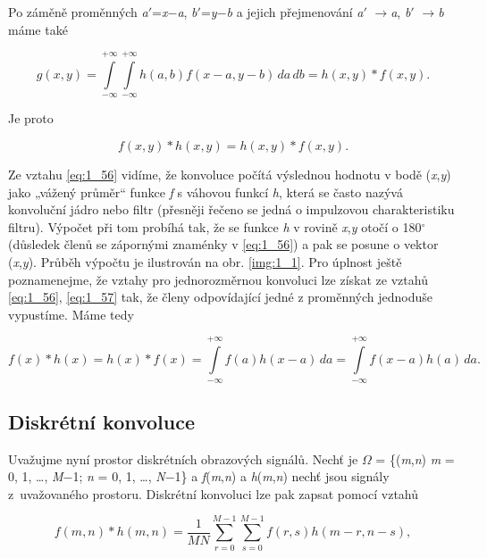 Po záměně proměnných \textit{a}$'$=\textit{x}$-$\textit{a}, \textit{b}$'$=\textit{y}$-$\textit{b} a jejich přejmenování \textit{a}$'$ $\rightarrow$\textit{a}, \textit{b}$'$ $\rightarrow$\textit{b} máme také

\begin{equation} \label{eq:1_57}
    g(x, y) = \int\limits_{-\infty}^{+\infty} \int\limits_{-\infty}^{+\infty} h(a, b) f(x-a, y-b) \,da \,db = h(x, y) \ast f(x, y).
\end{equation}

Je proto

\begin{equation} \label{eq:1_58}
    f(x, y) \ast h(x, y) = h(x, y) \ast f(x, y).
\end{equation}

Ze vztahu \eqref{eq:1_56} vidíme, že konvoluce počítá výslednou hodnotu v bodě (\textit{x},\textit{y}) jako „vážený průměr`` funkce \textit{f} s váhovou funkcí \textit{h}, která se často nazývá konvoluční jádro nebo filtr (přesněji řečeno se jedná o impulzovou charakteristiku filtru). Výpočet při tom probíhá tak, že se funkce \textit{h} v rovině \textit{x},\textit{y} otočí o 180$^\circ$ (důsledek členů se zápornými znaménky v \eqref{eq:1_56}) a pak se posune o vektor (\textit{x},\textit{y}). Průběh výpočtu je ilustrován na obr. \ref{img:1_1}. Pro úplnost ještě poznamenejme, že vztahy pro jednorozměrnou konvoluci lze získat ze vztahů \eqref{eq:1_56}, \eqref{eq:1_57} tak, že členy odpovídající jedné z proměnných jednoduše vypustíme. Máme tedy

\begin{equation} \label{eq:1_59}
    f(x) \ast h(x) = h(x) \ast f(x) = \int\limits_{-\infty}^{+\infty} f(a)h(x-a)\,da = \int\limits_{-\infty}^{+\infty} f(x-a) h(a)\,da.
\end{equation}

\subsection*{Diskrétní konvoluce} \label{sec:diskretni_konvoluce}

Uvažujme nyní prostor diskrétních obrazových signálů. Nechť je $\Omega$ = \{(\textit{m},\textit{n}) \textbar  \textit{m} = 0, 1, \dots, \textit{M}$-$1; \textit{n} = 0, 1, \dots, \textit{N}$-$1\} a \textit{f}(\textit{m},\textit{n}) a \textit{h}(\textit{m},\textit{n}) nechť jsou signály z~uvažovaného prostoru. Diskrétní konvoluci lze pak zapsat pomocí vztahů

\begin{equation} \label{eq:1_60}
    f(m, n) \ast h(m, n) = \frac{1}{MN} \sum\limits_{r=0}^{M-1} \sum\limits_{s=0}^{M-1} f(r, s) h(m - r, n - s),
\end{equation}

